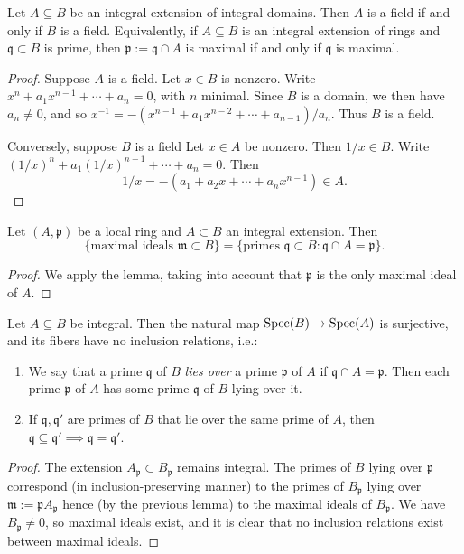 \documentclass[reqno]{amsart}
\begin{document}
\begin{lemma}
  Let $A \subseteq B$ be an integral extension of integral
  domains.
  Then $A$ is a field if and only if $B$ is a field.
  Equivalently, if $A \subseteq B$  is an integral extension of rings
  and $\mathfrak{q} \subset B$ is prime,
  then $\mathfrak{p} := \mathfrak{q} \cap A$ is maximal if and only if
  $\mathfrak{q}$ is maximal.
\end{lemma}
\begin{proof}
  Suppose $A$ is a field.  Let $x \in B$ is nonzero.  Write
  $x^n + a_1 x^{n-1} + \dotsb + a_n = 0$, with $n$ minimal.
  Since $B$ is a domain, we then have $a_n \neq 0$, and so
  $x^{-1} = -(x^{n-1} + a_1 x^{n-2} + \dotsb + a_{n-1})/a_n$.
  Thus $B$ is a field.

  Conversely, suppose $B$ is a field Let $x \in A$ be nonzero.
  Then $1/x \in B$.  Write
  $(1/x)^n + a_1 (1/x)^{n-1} + \dotsb + a_n = 0$.  Then
  \[
  1/x = - (a_1 + a_2 x + \dotsb + a_n x^{n-1}) \in A.
  \]
\end{proof}
\begin{corollary}
  Let $(A,\mathfrak{p})$ be a local ring
  and $A \subset B$ an integral extension.
  Then
  \[
  \{\text{maximal ideals $\mathfrak{m} \subset B$}\}
  =
  \{\text{primes $\mathfrak{q} \subset B$} : \mathfrak{q} \cap A = \mathfrak{p} \}.
  \]
\end{corollary}
\begin{proof}
  We apply the lemma, taking into account that $\mathfrak{p}$ is the only maximal ideal of $A$.
\end{proof}


\begin{theorem}
  Let $A \subseteq B$ be integral.
  Then the natural map $\operatorname{Spec}(B) \rightarrow \operatorname{Spec}(A)$ is
  surjective,
  and its fibers have no inclusion relations, i.e.:
  \begin{enumerate}
  \item
    We say that a prime $\mathfrak{q}$ of $B$ \emph{lies over}
    a prime $\mathfrak{p}$ of $A$ if $\mathfrak{q} \cap A =
    \mathfrak{p}$.
    Then each prime $\mathfrak{p}$ of $A$ has some prime
    $\mathfrak{q}$ of $B$ lying over it.
  \item If $\mathfrak{q}, \mathfrak{q} '$ are primes
    of $B$ that lie over the same prime of $A$,
    then $\mathfrak{q} \subseteq \mathfrak{q} ' \implies \mathfrak{q} = \mathfrak{q} '$.
  \end{enumerate}
\end{theorem}
\begin{proof}
  The extension $A_\mathfrak{p} \subset B_\mathfrak{p}$ remains
  integral.
  The primes of $B$ lying over $\mathfrak{p}$ correspond
  (in inclusion-preserving manner)
  to the primes of $B_\mathfrak{p}$ lying over $\mathfrak{m} :=
  \mathfrak{p} A_\mathfrak{p}$
  hence (by the previous lemma) to the maximal ideals of
  $B_\mathfrak{p}$.
  We have $B_\mathfrak{p} \neq 0$,
  so maximal ideals exist, and it is clear that no inclusion
  relations
  exist between maximal ideals.
\end{proof}
\end{document}
